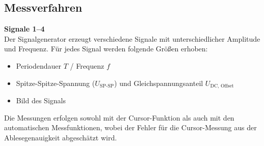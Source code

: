\subsection{Messverfahren}
\textbf{Signale 1–4}\\
Der Signalgenerator erzeugt verschiedene Signale mit unterschiedlicher Amplitude und Frequenz.
Für jedes Signal werden folgende Größen erhoben:
\begin{itemize}
    \item Periodendauer \(T\) / Frequenz \(f\)
    \item Spitze-Spitze-Spannung (\(U_\text{SP-SP}\)) und Gleichspannungsanteil \(U_\text{DC, Offset}\)
    \item Bild des Signals
\end{itemize}
Die Messungen erfolgen sowohl mit der Cursor-Funktion als auch mit den automatischen Messfunktionen, wobei der Fehler für die Cursor-Messung aus der Ablesegenauigkeit abgeschätzt wird. 

